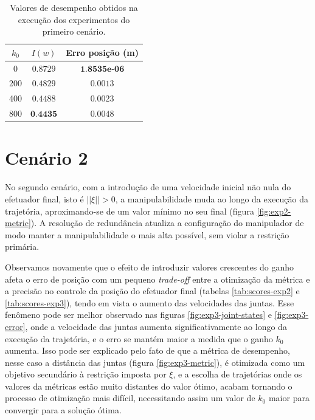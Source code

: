 \begin{table}[htbp]
    \centering
    \begin{tabular}{ccc}
        \toprule
        \( k_0 \) & \( I(w) \)  & Erro posição (m) \\
        \midrule
        0  & \( 0.8729 \) & \( \textbf{1.8535e-06} \) \\
        200  & \( 0.4829 \) & \( 0.0013 \) \\
        400  & \( 0.4488 \) & \( 0.0023 \) \\
        800  & \( \textbf{0.4435} \) & \( 0.0048 \) \\
        \bottomrule
    \end{tabular}
    \caption{Valores de desempenho obtidos na execução dos experimentos do primeiro cenário.}
    \label{tab:scores-exp1}
\end{table}

\section{Cenário 2}
	
No segundo cenário, com a introdução de uma velocidade inicial não nula do efetuador final, isto é \(||\xi|| > 0 \), 
a manipulabilidade muda ao longo da execução da trajetória, aproximando-se de um valor mínimo no seu final (figura \ref*{fig:exp2-metric}). 
A resolução de redundância atualiza a configuração do manipulador de modo manter a manipulabilidade o mais 
alta possível, sem violar a restrição primária.

Observamos novamente que o efeito de introduzir valores crescentes do ganho afeta o erro de posição 
com um pequeno \emph{trade-off} entre a otimização da métrica e a precisão no controle da posição 
do efetuador final (tabelas \ref*{tab:scores-exp2} e \ref*{tab:scores-exp3}), tendo em vista o aumento das 
velocidades das juntas. Esse fenômeno pode ser melhor observado nas figuras \ref*{fig:exp3-joint-states} e 
\ref*{fig:exp3-error}, onde a velocidade das juntas aumenta significativamente ao longo da execução da trajetória, 
e o erro se mantém maior a medida que o ganho \(k_0\) aumenta. Isso pode ser explicado pelo fato 
de que a métrica de desempenho, nesse caso a distância das juntas (figura \ref*{fig:exp3-metric}), é otimizada como um objetivo secundário 
à restrição imposta por \(\xi\), e a escolha de trajetórias onde os valores da métricas estão muito distantes
 do valor ótimo, acabam tornando o processo de otimização mais difícil, necessitando assim um valor de \(k_0\) 
 maior para convergir para a solução ótima.

